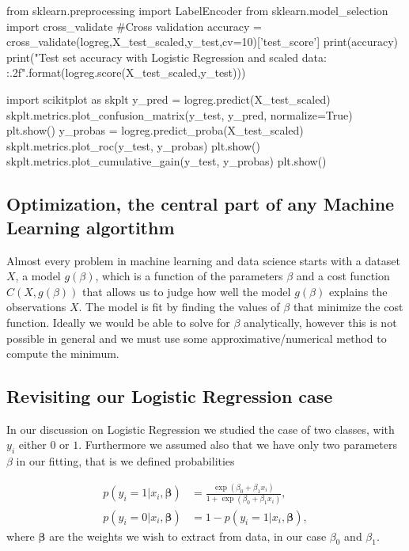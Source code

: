 \documentclass[%
oneside,                 %
final,                   %
10pt]{article}
\begin{document}
from sklearn.preprocessing import LabelEncoder
from sklearn.model_selection import cross_validate
#Cross validation
accuracy = cross_validate(logreg,X_test_scaled,y_test,cv=10)['test_score']
print(accuracy)
print("Test set accuracy with Logistic Regression  and scaled data: {:.2f}".format(logreg.score(X_test_scaled,y_test)))


import scikitplot as skplt
y_pred = logreg.predict(X_test_scaled)
skplt.metrics.plot_confusion_matrix(y_test, y_pred, normalize=True)
plt.show()
y_probas = logreg.predict_proba(X_test_scaled)
skplt.metrics.plot_roc(y_test, y_probas)
plt.show()
skplt.metrics.plot_cumulative_gain(y_test, y_probas)
plt.show()

\epycod



\subsection{Optimization, the central part of any Machine Learning algortithm}

Almost every problem in machine learning and data science starts with
a dataset $X$, a model $g(\beta)$, which is a function of the
parameters $\beta$ and a cost function $C(X, g(\beta))$ that allows
us to judge how well the model $g(\beta)$ explains the observations
$X$. The model is fit by finding the values of $\beta$ that minimize
the cost function. Ideally we would be able to solve for $\beta$
analytically, however this is not possible in general and we must use
some approximative/numerical method to compute the minimum.


\subsection{Revisiting our Logistic Regression case}

In our discussion on Logistic Regression we studied the 
case of
two classes, with $y_i$ either
$0$ or $1$. Furthermore we assumed also that we have only two
parameters $\beta$ in our fitting, that is we
defined probabilities

\begin{align*}
p(y_i=1|x_i,\bm{\beta}) &= \frac{\exp{(\beta_0+\beta_1x_i)}}{1+\exp{(\beta_0+\beta_1x_i)}},\nonumber\\
p(y_i=0|x_i,\bm{\beta}) &= 1 - p(y_i=1|x_i,\bm{\beta}),
\end{align*}
where $\bm{\beta}$ are the weights we wish to extract from data, in our case $\beta_0$ and $\beta_1$. 
\end{document}
